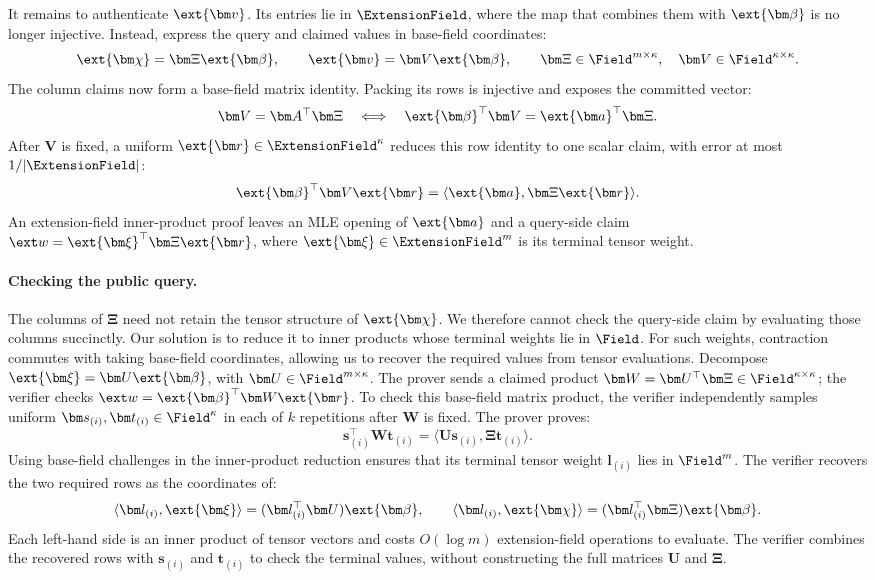 It remains to authenticate \(\ext{\bm v}\).
Its entries lie in \(\ExtensionField\), where the map that combines
them with \(\ext{\bm\beta}\) is no longer injective.
Instead, express the query and claimed values in base-field
coordinates:
\[
    \ext{\bm\chi}=\bm\Xi\ext{\bm\beta},
    \qquad
    \ext{\bm v}=\bm V\ext{\bm\beta},
    \qquad
    \bm\Xi\in\Field^{m\times\kappa},
    \quad \bm V\in\Field^{\kappa\times\kappa}.
\]
The column claims now form a base-field matrix identity.
Packing its rows is injective and exposes the committed vector:
\begin{equation*}
    \bm V=\bm A^\top\bm\Xi
    \quad\Longleftrightarrow\quad
    \ext{\bm\beta}^{\top}\bm V
    =\ext{\bm a}^{\top}\bm\Xi.
\end{equation*}
After \(\bm V\) is fixed, a uniform
\(\ext{\bm r}\in\ExtensionField^\kappa\) reduces this row identity
to one scalar claim, with error at most \(1/|\ExtensionField|\):
\[
    \ext{\bm\beta}^{\top}\bm V\ext{\bm r}
    =\langle\ext{\bm a},\bm\Xi\ext{\bm r}\rangle.
\]
An extension-field inner-product proof leaves an MLE opening of
\(\ext{\bm a}\) and a query-side claim
\(\ext w=\ext{\bm\xi}^{\top}\bm\Xi\ext{\bm r}\), where
\(\ext{\bm\xi}\in\ExtensionField^m\) is its terminal tensor weight.

\paragraph{Checking the public query.}
The columns of \(\bm\Xi\) need not retain the tensor structure of
\(\ext{\bm\chi}\). We therefore cannot check the query-side claim
by evaluating those columns succinctly.
Our solution is to reduce it to inner products whose terminal
weights lie in \(\Field\). For such weights, contraction commutes
with taking base-field coordinates, allowing us to recover the
required values from tensor evaluations.
Decompose \(\ext{\bm\xi}=\bm U\ext{\bm\beta}\), with
\(\bm U\in\Field^{m\times\kappa}\).
The prover sends a claimed product
\(\bm W=\bm U^\top\bm\Xi\in\Field^{\kappa\times\kappa}\);
the verifier checks \(\ext w=\ext{\bm\beta}^{\top}\bm W\ext{\bm r}\).
To check this base-field matrix product, the verifier independently
samples uniform
\(\bm s_{(i)},\bm t_{(i)}\in\Field^\kappa\) in each of \(k\)
repetitions after \(\bm W\) is fixed. The prover proves:
\[
    \bm s_{(i)}^\top\bm W\bm t_{(i)}
    =\langle\bm U\bm s_{(i)},\bm\Xi\bm t_{(i)}\rangle.
\]
Using base-field challenges in the inner-product reduction ensures
that its terminal tensor weight \(\bm l_{(i)}\) lies in \(\Field^m\).
The verifier recovers the two required rows as the coordinates of:
\[
    \langle\bm l_{(i)},\ext{\bm\xi}\rangle
       =(\bm l_{(i)}^\top\bm U)\ext{\bm\beta},
    \qquad
    \langle\bm l_{(i)},\ext{\bm\chi}\rangle
       =(\bm l_{(i)}^\top\bm\Xi)\ext{\bm\beta}.
\]
Each left-hand side is an inner product of tensor vectors and
costs \(O(\log m)\) extension-field operations to evaluate.
The verifier combines the recovered rows with \(\bm s_{(i)}\) and
\(\bm t_{(i)}\) to check the terminal values, without constructing
the full matrices \(\bm U\) and \(\bm\Xi\).

